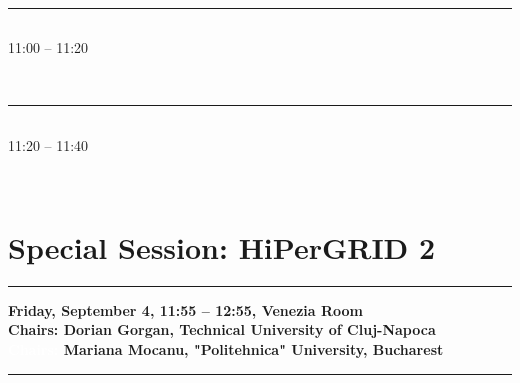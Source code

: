             
            \\ 
            \noindent\rule{\textwidth}{0.4pt}
\vspace*{-36pt}\subsection[ 
    	   {\bf Spider Mesh Overlay for Task Load Balancing in Cloud Computing
           } \\
           {\it C\u{a}t\u{a}lin-Constantin U\cb{s}urelu, Mihaela-C\u{a}t\u{a}lina Ni\cb{t}\u{a}, Roxana Istrate, Florin Pop, Nicolae Tapus
           }
	]
	    {
            }
	    11:00 -- 11:20 \nopagebreak

            
            \\ 
            \noindent\rule{\textwidth}{0.4pt}
\vspace*{-36pt}\subsection[ 
    	   {\bf Generating accuracy and integrity aware train movement maps using GNSS and MEMS sensors
           } \\
           {\it Vlad-Doru Colceriu, Teodor Stefanut, Victor Bacu, Dorian Gorgan
           }
	]
	    {
            }
	    11:20 -- 11:40 \nopagebreak

            
            \\ 

\section{{\bf \large Special Session: %
HiPerGRID 2
}} \vspace{-15pt} %
\noindent\rule{\textwidth}{0.4pt} \nopagebreak
{\bf  
Friday, September 4, 11:55 -- 12:55, Venezia Room
} \\ \nopagebreak
{\bf  Chairs: 
Dorian Gorgan, Technical University of Cluj-Napoca
} \\ \nopagebreak 
{\bf  \textcolor{white}{Chairs:} 
Mariana Mocanu, "Politehnica" University, Bucharest
} \\ \nopagebreak 
\noindent\rule{\textwidth}{0.4pt} \nopagebreak




